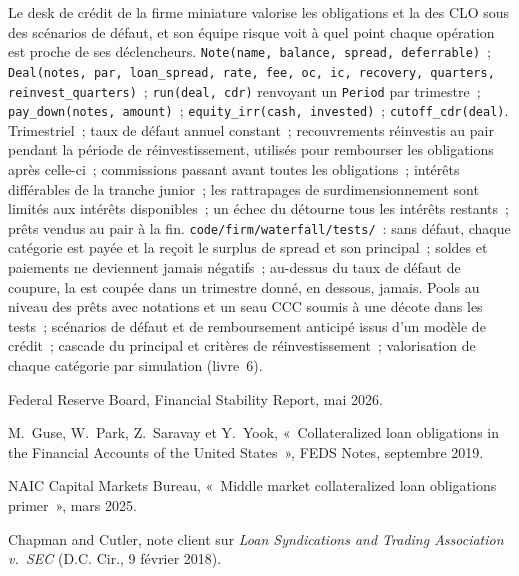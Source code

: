 \begin{build}
 Le desk de crédit de la firme miniature valorise les obligations et la  des CLO sous
des scénarios de défaut, et son équipe risque voit à quel point chaque opération est proche de ses déclencheurs.
 \texttt{Note(name, balance, spread, deferrable)}~; \texttt{Deal(notes, par, loan\_spread, rate, fee, oc, ic, recovery, quarters,
reinvest\_quarters)}~; \texttt{run(deal, cdr)} renvoyant un \texttt{Period} par
trimestre~; \texttt{pay\_down(notes, amount)}~; \texttt{equity\_irr(cash, invested)}~;
\texttt{cutoff\_cdr(deal)}.
 Trimestriel~; taux de défaut annuel constant~; recouvrements réinvestis au pair
pendant la période de réinvestissement, utilisés pour rembourser les obligations après celle-ci~; commissions passant avant toutes les obligations~;
intérêts différables de la tranche junior~; les rattrapages de surdimensionnement sont limités aux intérêts
disponibles~; un échec du  détourne tous les intérêts restants~; prêts vendus au
pair à la fin.
 \texttt{code/firm/waterfall/tests/}~: sans défaut, chaque
catégorie est payée et la  reçoit le surplus de spread et son principal~; soldes
et paiements ne deviennent jamais négatifs~; au-dessus du taux de défaut de coupure, la  est coupée dans
un trimestre donné, en dessous, jamais.
 Pools au niveau des prêts avec notations et un seau CCC soumis à une décote dans les tests~;
scénarios de défaut et de remboursement anticipé issus d'un modèle de crédit~; cascade du principal et
critères de réinvestissement~; valorisation de chaque catégorie par simulation (livre~6).
\end{build}

\begin{omsources}
\item Federal Reserve Board, Financial Stability Report, mai 2026.
\item M.~Guse, W.~Park, Z.~Saravay et Y.~Yook, «~Collateralized loan obligations in the
Financial Accounts of the United States~», FEDS Notes, septembre 2019.
\item NAIC Capital Markets Bureau, «~Middle market collateralized loan obligations
primer~», mars 2025.
\item Chapman and Cutler, note client sur \emph{Loan Syndications and Trading
Association v.\ SEC} (D.C. Cir., 9 février 2018).
\end{omsources}

